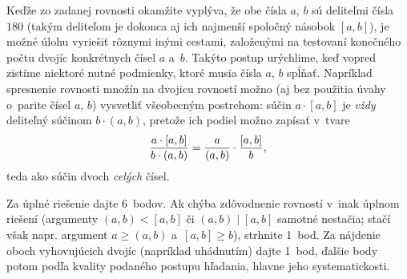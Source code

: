 {\poznamka
Keďže zo zadanej rovnosti okamžite vyplýva, že obe čísla $a$, $b$
sú deliteľmi čísla $180$ (takým deliteľom je dokonca aj ich
najmenší spoločný násobok $[a,b]$), je možné úlohu vyriešiť
rôznymi inými cestami, založenými na testovaní
konečného počtu dvojíc konkrétnych čísel $a$ a~$b$.
Takýto postup urýchlime, keď vopred zistíme niektoré nutné podmienky,
ktoré musia čísla $a$, $b$ spĺňať.
Napríklad spresnenie rovnosti množín na dvojicu rovností 
možno (aj bez použitia úvahy o~parite čísel $a$, $b$) vysvetliť
všeobecným postrehom: súčin $a\cdot[a,b]$ je {\it vždy\/}
deliteľný súčinom $b\cdot(a,b)$,
pretože ich podiel možno zapísať v~tvare
$$
\postdisplaypenalty 10000
\frac{a\cdot[a,b]}{b\cdot(a,b)}=\frac{a}{(a,b)}\cdot
\frac{[a,b]}{b},
$$
teda ako súčin dvoch {\it celých\/} čísel.

\nobreak\medskip\petit\noindent
Za úplné riešenie dajte 6~bodov. Ak chýba zdôvodnenie rovností 
v~inak úplnom riešení (argumenty $(a,b)<[a,b]$ či $(a,b)\mid[a,b]$
samotné nestačia; stačí však napr. argument $a\ge(a,b)$ a~$[a,b]\ge b$), strhnite 1~bod.  Za nájdenie oboch vyhovujúcich
dvojíc (napríklad uhádnutím) dajte 1~bod, ďalšie body
potom podľa kvality podaného postupu hľadania, hlavne jeho
systematickosti.
\endpetit
\bigbreak
}

